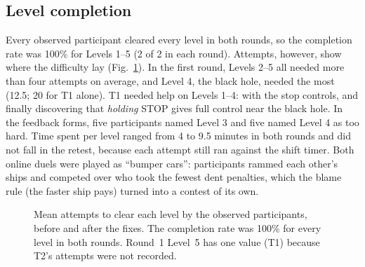 \documentclass[conference]{IEEEtran}
\begin{document}
\subsection{Level completion}
Every observed participant cleared every level in both rounds, so the completion rate was 100\% for Levels 1--5 (2 of 2 in each round). Attempts, however, show where the difficulty lay (Fig.~\ref{fig:completion}). In the first round, Levels 2--5 all needed more than four attempts on average, and Level 4, the black hole, needed the most (12.5; 20 for T1 alone). T1 needed help on Levels 1--4: with the stop controls, and finally discovering that \emph{holding} STOP gives full control near the black hole. In the feedback forms, five participants named Level 3 and five named Level 4 as too hard. Time spent per level ranged from 4 to 9.5 minutes in both rounds and did not fall in the retest, because each attempt still ran against the shift timer. Both online duels were played as ``bumper cars'': participants rammed each other's ships and competed over who took the fewest dent penalties, which the blame rule (the faster ship pays) turned into a contest of its own.

\begin{figure}[t]
\centering
{}
\caption{Mean attempts to clear each level by the observed participants, before and after the fixes. The completion rate was 100\% for every level in both rounds. Round~1 Level~5 has one value (T1) because T2's attempts were not recorded.}
\label{fig:completion}
\end{figure}
\end{document}
